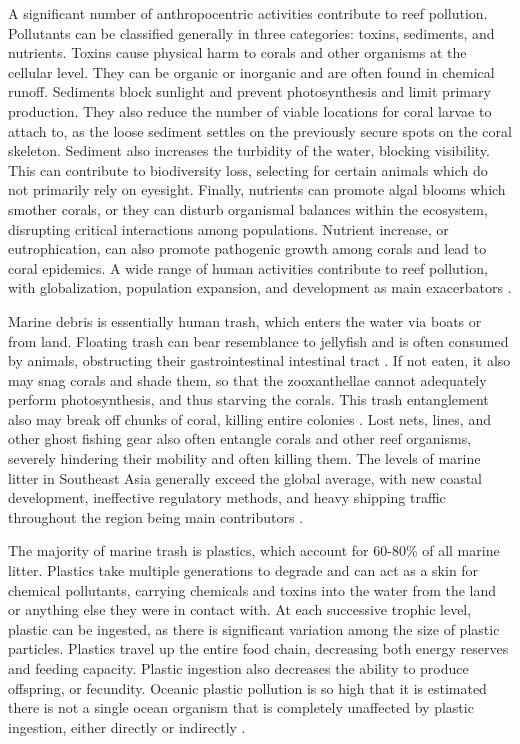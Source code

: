 \documentclass{book}\usepackage{knitr}
\begin{document}
\begin{knitrout}
\begin{kframe}
A significant number of anthropocentric activities contribute to reef pollution. Pollutants can be classified generally in three categories: toxins, sediments, and nutrients. Toxins cause physical harm to corals and other organisms at the cellular level. They can be organic or inorganic and are often found in chemical runoff. Sediments block sunlight and prevent photosynthesis and limit primary production. They also reduce the number of viable locations for coral larvae to attach to, as the loose sediment settles on the previously secure spots on the coral skeleton. Sediment also increases the turbidity of the water, blocking visibility. This can contribute to biodiversity loss, selecting for certain animals which do not primarily rely on eyesight. Finally, nutrients can promote algal blooms which smother corals, or they can disturb organismal balances within the ecosystem, disrupting critical interactions among populations. Nutrient increase, or eutrophication, can also promote pathogenic growth among corals and lead to coral epidemics. A wide range of human activities contribute to reef pollution, with globalization, population expansion, and development as main exacerbators \citep{4884777420100401}.

Marine debris is essentially human trash, which enters the water via boats or from land. Floating trash can bear resemblance to jellyfish and is often consumed by animals, obstructing their gastrointestinal intestinal tract \citep{coralreefalliance_2021}. If not eaten, it also may snag corals and shade them, so that the zooxanthellae cannot adequately perform photosynthesis, and thus starving the corals. This trash entanglement also may break off chunks of coral, killing entire colonies \citep{USEPA_2017}. Lost nets, lines, and other ghost fishing gear also often entangle corals and other reef organisms, severely hindering their mobility and often killing them. The levels of marine litter in Southeast Asia generally exceed the global average, with new coastal development, ineffective regulatory methods, and heavy shipping traffic throughout the region being main contributors \citep{4884777420100401}.

The majority of marine trash is plastics, which account for 60-80\% of all marine litter. Plastics take multiple generations to degrade and can act as a skin for chemical pollutants, carrying chemicals and toxins into the water from the land or anything else they were in contact with. At each successive trophic level, plastic can be ingested, as there is significant variation among the size of plastic particles. Plastics travel up the entire food chain, decreasing both energy reserves and feeding capacity. Plastic ingestion also decreases the ability to produce offspring, or fecundity. Oceanic plastic pollution is so high that it is estimated there is not a single ocean organism that is completely unaffected by plastic ingestion, either directly or indirectly \citep{12907334620180601}.


\end{kframe}
\end{knitrout}
\end{document}
